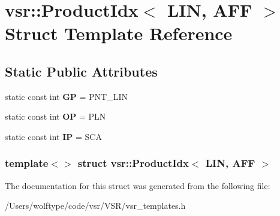 \hypertarget{structvsr_1_1_product_idx_3_01_l_i_n_00_01_a_f_f_01_4}{\section{vsr\-:\-:Product\-Idx$<$ L\-I\-N, A\-F\-F $>$ Struct Template Reference}
\label{structvsr_1_1_product_idx_3_01_l_i_n_00_01_a_f_f_01_4}
}
\subsection*{Static Public Attributes}
\begin{DoxyCompactItemize}
\item 
\hypertarget{structvsr_1_1_product_idx_3_01_l_i_n_00_01_a_f_f_01_4_aeade73040264961de1a5bbdea65c86fd}{static const int {\bfseries G\-P} = P\-N\-T\-\_\-\-L\-I\-N}\label{structvsr_1_1_product_idx_3_01_l_i_n_00_01_a_f_f_01_4_aeade73040264961de1a5bbdea65c86fd}

\item 
\hypertarget{structvsr_1_1_product_idx_3_01_l_i_n_00_01_a_f_f_01_4_a2f00cbbdbd652ca037feb9215450ec40}{static const int {\bfseries O\-P} = P\-L\-N}\label{structvsr_1_1_product_idx_3_01_l_i_n_00_01_a_f_f_01_4_a2f00cbbdbd652ca037feb9215450ec40}

\item 
\hypertarget{structvsr_1_1_product_idx_3_01_l_i_n_00_01_a_f_f_01_4_a31f9570e41ef2b0d57eda76bbea6541c}{static const int {\bfseries I\-P} = S\-C\-A}\label{structvsr_1_1_product_idx_3_01_l_i_n_00_01_a_f_f_01_4_a31f9570e41ef2b0d57eda76bbea6541c}

\end{DoxyCompactItemize}
\subsubsection*{template$<$$>$ struct vsr\-::\-Product\-Idx$<$ L\-I\-N, A\-F\-F $>$}



The documentation for this struct was generated from the following file\-:\begin{DoxyCompactItemize}
\item 
/\-Users/wolftype/code/vsr/\-V\-S\-R/vsr\-\_\-templates.\-h\end{DoxyCompactItemize}
